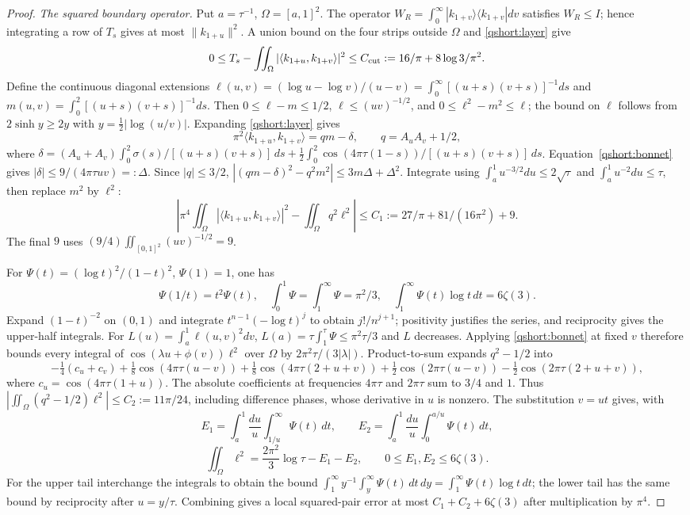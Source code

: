 \begin{proof}
\emph{The squared boundary operator.}
Put $a=\tau^{-1}$, $\Omega=[a,1]^2$.
The operator $W_R=\int_0^\infty|k_{1+v}\rangle\langle k_{1+v}|dv$
satisfies $W_R\le I$; hence integrating a row of $T_s$ gives at most
$\|k_{1+u}\|^2$. A union bound on the four strips outside $\Omega$
and \eqref{qshort:layer} give
\begin{equation}\label{qshort:cut}
0\le T_s-\iint_\Omega|\langle k_{1+u},k_{1+v}\rangle|^2
\le C_{\rm cut}:=16/\pi+8\log3/\pi^2.
\end{equation}
Define the continuous diagonal extensions
$\ell(u,v)=(\log u-\log v)/(u-v)
=\int_0^\infty[(u+s)(v+s)]^{-1}ds$ and
$m(u,v)=\int_0^2[(u+s)(v+s)]^{-1}ds$.
Then $0\le\ell-m\le1/2$, $\ell\le(uv)^{-1/2}$, and
$0\le\ell^2-m^2\le\ell$; the bound on $\ell$ follows from
$2\sinh y\ge2y$ with $y=\frac12|\log(u/v)|$.
Expanding \eqref{qshort:layer} gives
\[
\pi^2\langle k_{1+u},k_{1+v}\rangle=qm-\delta,\qquad q=A_uA_v+1/2,
\]
where
$\delta=(A_u+A_v)\int_0^2\sigma(s)/[(u+s)(v+s)]\,ds
+\frac12\int_0^2\cos(4\pi\tau(1-s))/[(u+s)(v+s)]\,ds$.
Equation~\eqref{qshort:bonnet} gives
$|\delta|\le9/(4\pi\tau uv)=:\Delta$.
Since $|q|\le3/2$,
$|(qm-\delta)^2-q^2m^2|\le3m\Delta+\Delta^2$.
Integrate using $\int_a^1u^{-3/2}du\le2\sqrt\tau$ and
$\int_a^1u^{-2}du\le\tau$, then replace $m^2$ by $\ell^2$:
\begin{equation}\label{qshort:pair-error}
\left|\pi^4\iint_\Omega|\langle k_{1+u},k_{1+v}\rangle|^2
-\iint_\Omega q^2\ell^2\right|
\le C_1:=27/\pi+81/(16\pi^2)+9.
\end{equation}
The final $9$ uses $(9/4)\iint_{[0,1]^2}(uv)^{-1/2}=9$.

For $\Psi(t)=(\log t)^2/(1-t)^2$, $\Psi(1)=1$, one has
\[
\Psi(1/t)=t^2\Psi(t),\quad
\int_0^1\Psi=\int_1^\infty\Psi=\pi^2/3,\quad
\int_1^\infty\Psi(t)\log t\,dt=6\zeta(3).
\]
Expand $(1-t)^{-2}$ on $(0,1)$ and integrate
$t^{n-1}(-\log t)^j$ to obtain $j!/n^{j+1}$; positivity
justifies the series, and reciprocity gives the upper-half integrals.
For $L(u)=\int_a^1\ell(u,v)^2dv$,
$L(a)=\tau\int_1^\tau\Psi\le\pi^2\tau/3$ and $L$ decreases.
Applying \eqref{qshort:bonnet} at fixed $v$ therefore bounds
every integral of $\cos(\lambda u+\phi(v))\ell^2$ over $\Omega$
by $2\pi^2\tau/(3|\lambda|)$.
Product-to-sum expands $q^2-1/2$ into
\[
-\tfrac14(c_u+c_v)
+\tfrac18\cos(4\pi\tau(u-v))
+\tfrac18\cos(4\pi\tau(2+u+v))
+\tfrac12\cos(2\pi\tau(u-v))
-\tfrac12\cos(2\pi\tau(2+u+v)),
\]
where $c_u=\cos(4\pi\tau(1+u))$.
The absolute coefficients at frequencies $4\pi\tau$ and $2\pi\tau$
sum to $3/4$ and $1$. Thus
$|\iint_\Omega(q^2-1/2)\ell^2|\le C_2:=11\pi/24$,
including difference phases, whose derivative in $u$ is nonzero.
The substitution $v=ut$ gives, with
\[
E_1=\int_a^1\frac{du}{u}\int_{1/u}^{\infty}\Psi(t)\,dt,
\qquad
E_2=\int_a^1\frac{du}{u}\int_0^{a/u}\Psi(t)\,dt,
\]
\[
\iint_\Omega\ell^2=\frac{2\pi^2}3\log\tau-E_1-E_2,\qquad
0\le E_1,E_2\le6\zeta(3).
\]
For the upper tail interchange the integrals to obtain the bound
$\int_1^\infty y^{-1}\int_y^\infty\Psi(t)\,dt\,dy
=\int_1^\infty\Psi(t)\log t\,dt$; the lower tail has the same
bound by reciprocity after $u=y/\tau$.
Combining gives a local squared-pair error at most
$C_1+C_2+6\zeta(3)$ after multiplication by $\pi^4$.


\end{proof}
